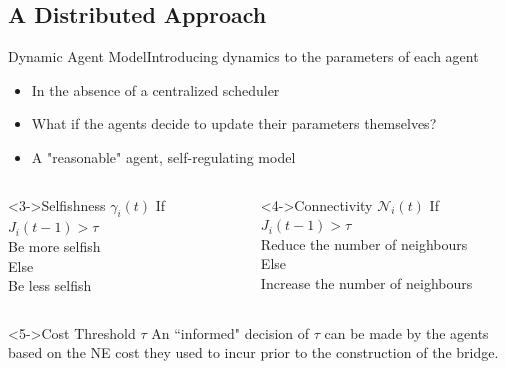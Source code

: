 \documentclass[aspectratio=169]{beamer}
\begin{document}
\subsection{A Distributed Approach}

\begin{frame}{Dynamic Agent Model}{Introducing dynamics to the parameters of each agent}
\begin{itemize}
    \item<1-> In the absence of a centralized scheduler
    \item<2-> What if the agents decide to update their parameters themselves?
    \item<6-> A "reasonable" agent, self-regulating model 
\end{itemize}
\begin{columns}
        \begin{block}<3->{Selfishness $\gamma_i(t)$}
            If $J_i(t-1) > \tau$\\
            \quad Be more selfish\\
            Else\\
            \quad Be less selfish\\
        \end{block}
        
        \begin{block}<4->{Connectivity $\mathcal{N}_i(t)$}
            If $J_i(t-1) > \tau$\\
            \quad Reduce the number of neighbours\\
            Else\\
            \quad Increase the number of neighbours\\
        \end{block}
    \end{columns}
    \begin{block}<5->{Cost Threshold $\tau$}
    An ``informed" decision of $\tau$ can be made by the agents based on the NE cost they used to incur prior to the construction of the bridge.
    \end{block}
\end{frame}
\end{document}
